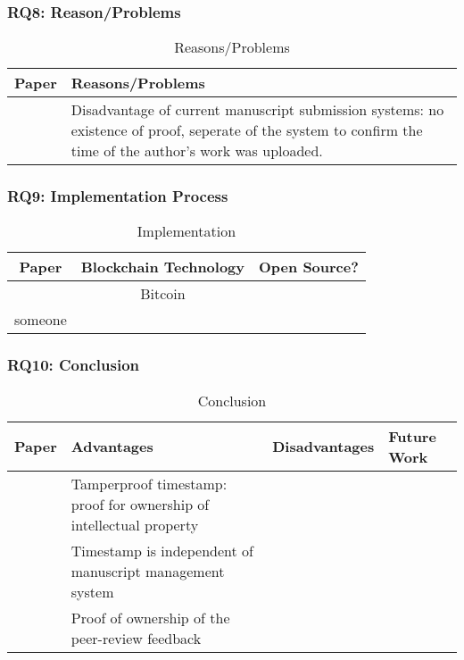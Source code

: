\clearpage
\subsubsection{RQ8: Reason/Problems}

\begin{longtable}{ |c|p{6cm}| }
	\caption{Reasons/Problems}
	\label{tab:rq8_reason_problem}\\
	\hline
 	\textbf{Paper} & \textbf{Reasons/Problems} \\ [0.5ex] 
 	\hline\hline
 	\endhead
 	\cite{2017_Gipp} & Disadvantage of current manuscript submission systems: no existence of proof, seperate of the system to confirm the time of the author's work was uploaded.\\
	\hline
\end{longtable}

\clearpage
\subsubsection{RQ9: Implementation Process}

\begin{longtable}{ |c|c|c| }
	\caption{Implementation}
	\label{tab:rq9_implementation_process}\\
	\hline
 	\textbf{Paper} & Blockchain Technology & \textbf{Open Source?} \\ [0.5ex] 
 	\hline\hline
 	\endhead
 	\cite{2017_Gipp} & Bitcoin & \cmark \\
	\hline
	someone & \xmark \\
	\hline
\end{longtable}

\clearpage
\subsubsection{RQ10: Conclusion}

\begin{longtable}{ |c|p{4cm}|p{4cm}|p{4cm}| }
	\caption{Conclusion}
	\label{tab:rq10_conclusion}\\
	\hline
 	\textbf{Paper} & \textbf{Advantages} & \textbf{Disadvantages} & \textbf{Future Work}\\ [0.5ex] 
 	\hline\hline
 	\endhead
 	\multirow{3}{*}{\cite{2017_Gipp}} & Tamperproof timestamp: proof for ownership of intellectual property & \multirow{3}{*}{\xmark } & \\
	\cline{2-2}
	 & Timestamp is independent of manuscript management system & & \\
	\cline{2-2}
	 & Proof of ownership of the peer-review feedback & & \\
	\hline
\end{longtable}
